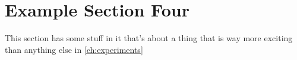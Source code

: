 
\section{Example Section Four}\label{sec:ExampleFour}

This section has some stuff in it that's about a thing that is way more exciting than anything else in \autoref{ch:experiments}
